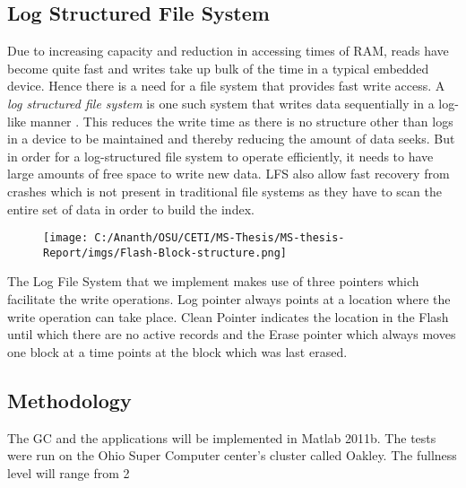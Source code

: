 \subsection{Log Structured File System}
	Due to increasing capacity and reduction in accessing times of RAM, reads have become quite fast and writes take up bulk of the time in a typical embedded device. Hence there is a need for a file system that provides fast write access. A \emph{log structured file system} is one such system that writes data sequentially in a log-like manner \cite{Rosenblum91}. This reduces the write time as there is no structure other than logs in a device to be maintained and thereby reducing the amount of data seeks. But in order for a log-structured file system to operate efficiently, it needs to have large amounts of free space to write new data. LFS also allow fast recovery from crashes which is not present in traditional file systems as they have to scan the entire set of data in order to build the index.

\begin{figure}
	\centering
	\texttt{[image: C:/Ananth/OSU/CETI/MS-Thesis/MS-thesis-Report/imgs/Flash-Block-structure.png]}
\end{figure}

The Log File System that we implement makes use of three pointers which facilitate the write operations. Log pointer always points at a location where the write operation can take place. Clean Pointer indicates the location in the Flash until which there are no active records and the Erase pointer which always moves one block at a time points at the block which was last erased. 

\subsection{Methodology}
The GC and the applications will be implemented in Matlab 2011b. The tests were run on the Ohio Super Computer center’s cluster called Oakley. The fullness level will range from 2%

